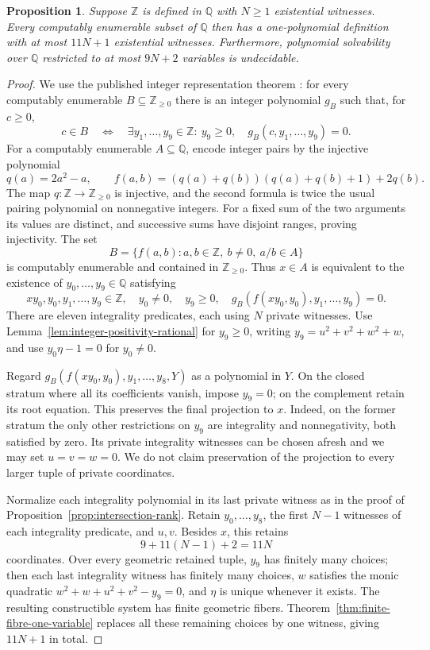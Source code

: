 \documentclass[11pt]{article}
\newtheorem{proposition}[theorem]{Proposition}
\theoremstyle{definition}
\newcommand{\Q}{\mathbb Q}
\newcommand{\Z}{\mathbb Z}
\begin{document}
\begin{proposition}\label{prop:quantitative-mrdp}
Suppose $\Z$ is defined in $\Q$ with $N\ge1$ existential witnesses.
Every computably enumerable subset of $\Q$ then has a one-polynomial
definition with at most $11N+1$ existential witnesses. Furthermore,
polynomial solvability over $\Q$ restricted to at most $9N+2$
variables is undecidable.
\end{proposition}
\begin{proof}
We use the published integer representation theorem
\cite[Theorem 1.1(i)]{Sun2021}: for every computably enumerable
$B\subseteq\mathbb Z_{\ge0}$ there is an integer polynomial $g_B$
such that, for $c\ge0$,
\[
 c\in B\quad\Longleftrightarrow\quad
 \exists y_1,\ldots,y_9\in\Z:\
 y_9\ge0,\quad g_B(c,y_1,\ldots,y_9)=0.
\]
For a computably enumerable $A\subseteq\Q$, encode integer pairs
by the injective polynomial
\[
 q(a)=2a^2-a,\qquad
 f(a,b)=(q(a)+q(b))(q(a)+q(b)+1)+2q(b).
\]
The map $q:\Z\to\mathbb Z_{\ge0}$ is injective, and the second
formula is twice the usual pairing polynomial on nonnegative integers.
For a fixed sum of the two arguments its values are distinct, and
successive sums have disjoint ranges, proving injectivity.
The set
\[
 B=\{f(a,b):a,b\in\Z,\ b\ne0,\ a/b\in A\}
\]
is computably enumerable and contained in $\mathbb Z_{\ge0}$.
Thus $x\in A$ is equivalent to the existence of
$y_0,\ldots,y_9\in\Q$ satisfying
\[
 xy_0,y_0,y_1,\ldots,y_9\in\Z,\quad
 y_0\ne0,\quad y_9\ge0,\quad
 g_B(f(xy_0,y_0),y_1,\ldots,y_9)=0.
\]
There are eleven integrality predicates, each using $N$ private
witnesses. Use Lemma~\ref{lem:integer-positivity-rational} for
$y_9\ge0$, writing $y_9=u^2+v^2+w^2+w$, and use
$y_0\eta-1=0$ for $y_0\ne0$.

Regard $g_B(f(xy_0,y_0),y_1,\ldots,y_8,Y)$ as a polynomial in $Y$.
On the closed stratum where all its coefficients vanish, impose
$y_9=0$; on the complement retain its root equation. This preserves
the final projection to $x$. Indeed, on the former stratum the only
other restrictions on $y_9$ are integrality and nonnegativity, both
satisfied by zero. Its private integrality witnesses can be chosen
afresh and we may set $u=v=w=0$. We do not claim preservation of
the projection to every larger tuple of private coordinates.

Normalize each integrality polynomial in its last private witness as
in the proof of Proposition~\ref{prop:intersection-rank}. Retain
$y_0,\ldots,y_8$, the first $N-1$ witnesses of each integrality
predicate, and $u,v$. Besides $x$, this retains
\[
 9+11(N-1)+2=11N
\]
coordinates. Over every geometric retained tuple, $y_9$ has finitely
many choices; then each last integrality witness has finitely many
choices, $w$ satisfies the monic quadratic
$w^2+w+u^2+v^2-y_9=0$, and $\eta$ is unique whenever it exists.
The resulting constructible system has finite geometric fibers.
Theorem~\ref{thm:finite-fibre-one-variable} replaces all these
remaining choices by one witness, giving $11N+1$ in total.


\end{proof}
\end{document}
